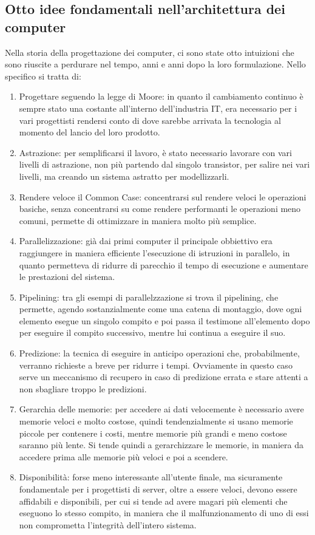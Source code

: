 \documentclass[a4paper,12pt]{article}
\theoremstyle{break}
\numberwithin{equation}{section}
\begin{document}
\subsection{Otto idee fondamentali nell'architettura dei computer}
Nella storia della progettazione dei computer, ci sono state otto intuizioni che sono riuscite a perdurare nel tempo, anni e anni dopo la loro formulazione. Nello specifico si tratta di:
\begin{enumerate}
    \item Progettare seguendo la legge di Moore: in quanto il cambiamento continuo è sempre stato una costante all'interno dell'industria IT, era necessario per i vari progettisti rendersi conto di dove sarebbe arrivata la tecnologia al momento del lancio del loro prodotto.
    \item Astrazione: per semplificarsi il lavoro, è stato necessario lavorare con vari livelli di astrazione, non più partendo dal singolo transistor, per salire nei vari livelli, ma creando un sistema astratto per modellizzarli.
    \item Rendere veloce il Common Case: concentrarsi sul rendere veloci le operazioni basiche, senza concentrarsi su come rendere performanti le operazioni meno comuni, permette di ottimizzare in maniera molto più semplice.
    \item Parallelizzazione: già dai primi computer il principale obbiettivo era raggiungere in maniera efficiente l'esecuzione di istruzioni in parallelo, in quanto permetteva di ridurre di parecchio il tempo di esecuzione e aumentare le prestazioni del sistema.
    \item Pipelining: tra gli esempi di parallelzzazione si trova il pipelining, che permette, agendo sostanzialmente come una catena di montaggio, dove ogni elemento esegue un singolo compito e poi passa il testimone all'elemento dopo per eseguire il compito successivo, mentre lui continua a eseguire il suo.
    \item Predizione: la tecnica di eseguire in anticipo operazioni che, probabilmente, verranno richieste a breve per ridurre i tempi. Ovviamente in questo caso serve un meccanismo di recupero in caso di predizione errata e stare attenti a non sbagliare troppo le predizioni.
    \item Gerarchia delle memorie: per accedere ai dati velocemente è necessario avere memorie veloci e molto costose, quindi tendenzialmente si usano memorie piccole per contenere i costi, mentre memorie più grandi e meno costose saranno più lente. Si tende quindi a gerarchizzare le memorie, in maniera da accedere prima alle memorie più veloci e poi a scendere.
    \item Disponibilità: forse meno interessante all'utente finale, ma sicuramente fondamentale per i progettisti di server, oltre a essere veloci, devono essere affidabili e disponibili, per cui si tende ad avere magari più elementi che eseguono lo stesso compito, in maniera che il malfunzionamento di uno di essi non comprometta l'integrità dell'intero sistema.
\end{enumerate}
\end{document}
